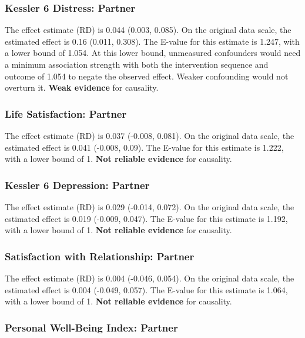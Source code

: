 \documentclass[
  singlecolumn]{article}
\begin{document}
\subsubsection{Kessler 6 Distress:
Partner}\label{kessler-6-distress-partner-7}

The effect estimate (RD) is 0.044 (0.003, 0.085). On the original data
scale, the estimated effect is 0.16 (0.011, 0.308). The E-value for this
estimate is 1.247, with a lower bound of 1.054. At this lower bound,
unmeasured confounders would need a minimum association strength with
both the intervention sequence and outcome of 1.054 to negate the
observed effect. Weaker confounding would not overturn it. \textbf{Weak
evidence} for causality.

\subsubsection{Life Satisfaction:
Partner}\label{life-satisfaction-partner-7}

The effect estimate (RD) is 0.037 (-0.008, 0.081). On the original data
scale, the estimated effect is 0.041 (-0.008, 0.09). The E-value for
this estimate is 1.222, with a lower bound of 1. \textbf{Not reliable
evidence} for causality.

\subsubsection{Kessler 6 Depression:
Partner}\label{kessler-6-depression-partner-7}

The effect estimate (RD) is 0.029 (-0.014, 0.072). On the original data
scale, the estimated effect is 0.019 (-0.009, 0.047). The E-value for
this estimate is 1.192, with a lower bound of 1. \textbf{Not reliable
evidence} for causality.

\subsubsection{Satisfaction with Relationship:
Partner}\label{satisfaction-with-relationship-partner-7}

The effect estimate (RD) is 0.004 (-0.046, 0.054). On the original data
scale, the estimated effect is 0.004 (-0.049, 0.057). The E-value for
this estimate is 1.064, with a lower bound of 1. \textbf{Not reliable
evidence} for causality.

\subsubsection{Personal Well-Being Index:
Partner}\label{personal-well-being-index-partner-7}
\end{document}
